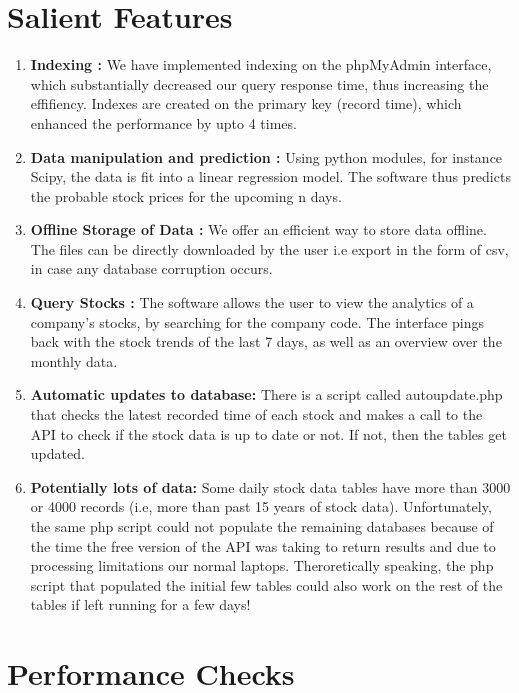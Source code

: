 \documentclass{report}
\begin{document}
\section{Salient Features} 
\begin{enumerate}


\item \textbf{Indexing :} We have implemented indexing on the phpMyAdmin interface, which substantially decreased our query response time, thus increasing the 
effifiency. Indexes are created on the primary key (record time), which enhanced the performance by upto 4 times.

\item \textbf{Data manipulation and prediction :} Using python modules, for instance Scipy, the data is fit into a linear regression model. The software thus predicts the 
probable stock prices for the upcoming n days.

\item \textbf{Offline Storage of Data :} We offer an efficient way to store data offline. The files can be directly downloaded by the user i.e export in the form of 
csv, in case any database corruption occurs.

\item \textbf{Query Stocks :} The software allows the user to view the analytics of a company's stocks, by searching for the company code. The interface pings back with the stock trends of the last 7 days, as well as an overview over the monthly data.

\item \textbf{Automatic updates to database:} There is a script called autoupdate.php that checks the latest recorded time of each stock and makes a call to the API to check if the stock data is up to date or not. If not, then the tables get updated.

\item \textbf{Potentially lots of data:} Some daily stock data tables have more than 3000 or 4000 records (i.e, more than past 15 years of stock data). Unfortunately, the same php script could not populate the remaining databases because of the time the free version of the API was taking to return results and due to processing limitations our normal laptops. Theroretically speaking, the php script that populated the initial few tables could also work on the rest of the tables if left running for a few days!

\end{enumerate}

\section{Performance Checks}
\end{document}
